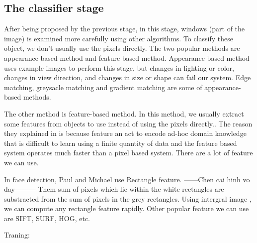 \subsection{The classifier stage}

After being proposed by the previous stage, in this stage, windows (part of the image) is examined more carefully using other algorithms.
To classify these object, we don't usually use the pixels directly. The two popular methods are appearance-based method and feature-based method. 
Appearance based method uses example images to perform this stage, but changes in lighting or color, changes in view direction, and changes in size or shape can fail our system. Edge matching, greysacle matching and gradient matching are some of appearance-based methods.

The other method is feature-based method. In this method, we usually extract some features from objects to use instead of using the pixels directly.\cite{realtimeface}. The reason they explained in \cite{realtimeface} is because feature an act to encode ad-hoc domain knowledge that is difficult to learn using a finite quantity of data and the feature based system operates much faster than a pixel based system. There are a lot of feature we can use. 

In face detection\cite{realtimeface}, Paul and Michael use Rectangle feature. 
------Chen cai hinh vo day---------
Them sum of pixels which lie within the white rectangles are substracted from the sum of pixels in the grey rectangles. Using intergral image \cite{realtimeface}, we can compute any rectangle feature rapidly. Other popular feature we can use are SIFT, SURF, HOG, etc.

Traning: